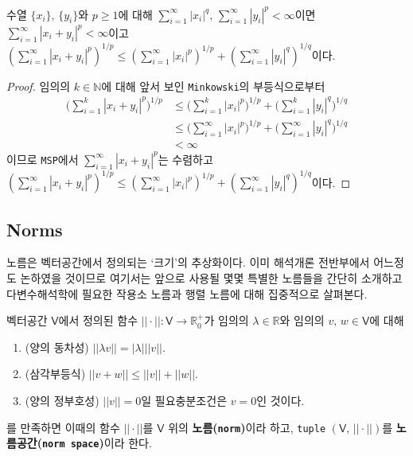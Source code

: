 \begin{corollary}
    수열 $\{x_i\},\,\{y_i\}$와 $p\geq1$에 대해 $\sum_{i=1}^\infty|x_i|^q,\,\sum_{i=1}^\infty|y_i|^p<\infty$이면 $\sum_{i=1}^\infty|x_i+y_i|^p<\infty$이고 $(\sum_{i=1}^\infty|x_i+y_i|^p)^{1/p}\leq(\sum_{i=1}^\infty|x_i|^p)^{1/p}+(\sum_{i=1}^\infty|y_i|^q)^{1/q}$이다.
\end{corollary}

\begin{proof}
    임의의 $k\in\mathbb{N}$에 대해 앞서 보인 \texttt{Minkowski}의 부등식으로부터
    \begin{align*}
        \bigg(\sum_{i=1}^k|x_i+y_i|^p\bigg)^{1/p}&\leq\bigg(\sum_{i=1}^k|x_i|^p\bigg)^{1/p}+\bigg(\sum_{i=1}^k|y_i|^q\bigg)^{1/q}\\
        &\leq\bigg(\sum_{i=1}^\infty|x_i|^p\bigg)^{1/p}+\bigg(\sum_{i=1}^\infty|y_i|^q\bigg)^{1/q}\\
        &<\infty
    \end{align*}
    이므로 \texttt{MSP}에서 $\sum_{i=1}^\infty|x_i+y_i|^p$는 수렴하고 $(\sum_{i=1}^\infty|x_i+y_i|^p)^{1/p}\leq(\sum_{i=1}^\infty|x_i|^p)^{1/p}+(\sum_{i=1}^\infty|y_i|^q)^{1/q}$이다.
\end{proof}

\subsection{Norms}

노름은 벡터공간에서 정의되는 `크기'의 추상화이다. 이미 해석개론 전반부에서 어느정도 논하였을 것이므로 여기서는 앞으로 사용될 몇몇 특별한 노름들을 간단히 소개하고 다변수해석학에 필요한 작용소 노름과 행렬 노름에 대해 집중적으로 살펴본다.

\begin{definition}
    벡터공간 $\mathsf{V}$에서 정의된 함수 $||\cdot||:\mathsf{V}\to\mathbb{R}_0^+$가 임의의 $\lambda\in\mathbb{R}$와 임의의 $v,\,w\in\mathsf{V}$에 대해
    \begin{enumerate}
        \item (양의 동차성) $||\lambda v||=|\lambda|||v||$.
        \item (삼각부등식) $||v+w||\leq||v||+||w||$.
        \item (양의 정부호성) $||v||=0$일 필요충분조건은 $v=0$인 것이다.
    \end{enumerate}
    를 만족하면 이때의 함수 $||\cdot||$를 $\mathsf{V}$ 위의 \textbf{노름(\texttt{norm})}이라 하고, \texttt{tuple} $(\mathsf{V},\,||\cdot||)$를 \textbf{노름공간(\texttt{norm space})}이라 한다.
\end{definition}

